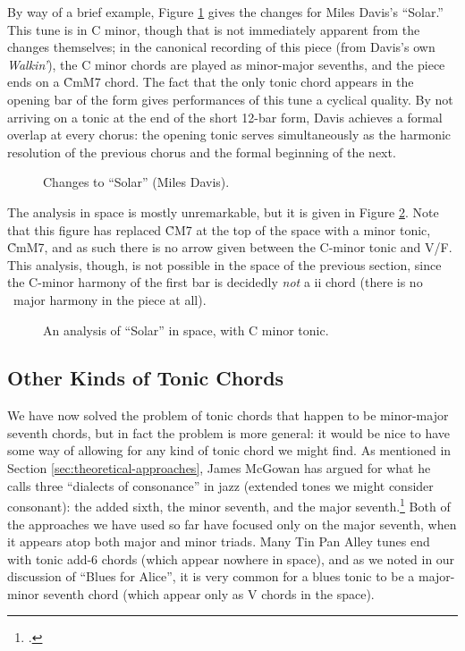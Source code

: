 {By way of a brief example, Figure \ref{tfe:solar-changes} gives the changes
for Miles Davis's ``Solar.'' This tune is in C minor, though that is not
immediately apparent from the changes themselves; in the canonical recording
of this piece (from Davis's own \emph{Walkin'}), the C minor
chords are played as minor-major sevenths, and the piece ends on a \h{CmM7}
chord.\nocite{davis:walkin} The fact that the only tonic chord appears in the
opening bar of the form gives performances of this tune a cyclical quality. By
not arriving on a tonic at the end of the short 12-bar form, Davis achieves a
formal overlap at every chorus: the opening tonic serves simultaneously as the
harmonic resolution of the previous chorus and the formal beginning of the
next.

\begin{figure}[tbhp]
  \caption{Changes to ``Solar'' (Miles Davis).}
  \label{tfe:solar-changes}
\end{figure}

The analysis in \tf space is mostly unremarkable, but it is given in Figure
\ref{tfe:solar-space}. Note that this figure has replaced \h{CM7} at the top
of the space with a minor tonic, \h{CmM7}, and as such there is no arrow given
between the C-minor tonic and V/F. This analysis, though, is not
possible in the \tf space of the previous section, since the C-minor harmony
of the first bar is decidedly \emph{not} a ii chord (there is no
\Bflat\ major harmony in the piece at all).

\begin{figure}[tbh]
  \caption{An analysis of ``Solar'' in \tf space, with C minor tonic.}
  \label{tfe:solar-space}
\end{figure}



\subsection{Other Kinds of Tonic Chords}

We have now solved the problem of tonic chords that happen to be minor-major
seventh chords, but in fact the problem is more general: it would be nice to
have some way of allowing for any kind of tonic chord we might find. As
mentioned in Section \ref{sec:theoretical-approaches}, James McGowan has
argued for what he calls three ``dialects of consonance'' in jazz (extended
tones we might consider consonant): the added sixth, the minor seventh, and
the major seventh.\footcite[76--79]{mcgowan:2005} Both of the approaches we
have used so far have focused only on the major seventh, when it appears atop
both major and minor triads. Many Tin Pan Alley tunes end with tonic add-6
chords (which appear nowhere in \tf space), and as we noted in our discussion
of ``Blues for Alice'', it is very common for a blues tonic to be a
major-minor seventh chord (which appear only as V chords in the space).

}
